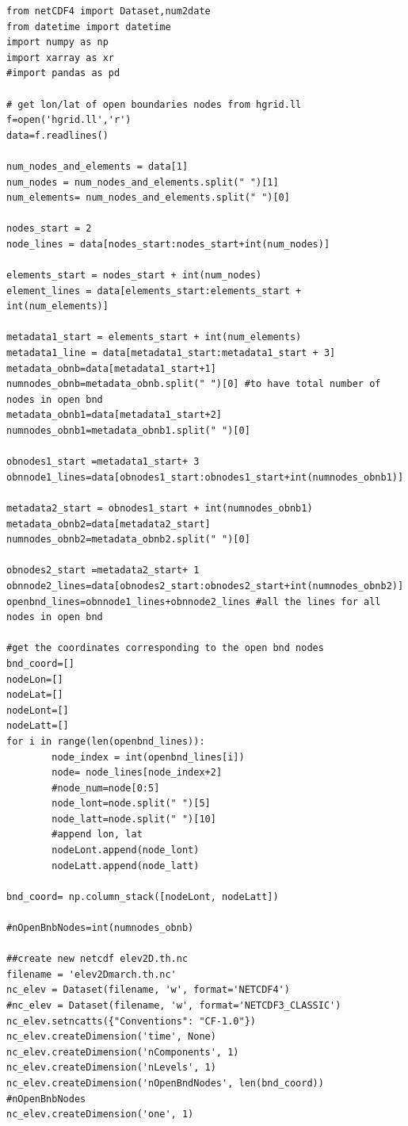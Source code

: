 \documentclass[preprints,briefreport,accept,oneauthor,pdftex]{Definitions/mdpi}
\begin{document}
\begin{verbatim}
from netCDF4 import Dataset,num2date
from datetime import datetime
import numpy as np
import xarray as xr
#import pandas as pd

# get lon/lat of open boundaries nodes from hgrid.ll
f=open('hgrid.ll','r')
data=f.readlines()

num_nodes_and_elements = data[1]
num_nodes = num_nodes_and_elements.split(" ")[1]
num_elements= num_nodes_and_elements.split(" ")[0]

nodes_start = 2
node_lines = data[nodes_start:nodes_start+int(num_nodes)]

elements_start = nodes_start + int(num_nodes) 
element_lines = data[elements_start:elements_start + int(num_elements)]

metadata1_start = elements_start + int(num_elements) 
metadata1_line = data[metadata1_start:metadata1_start + 3]
metadata_obnb=data[metadata1_start+1]
numnodes_obnb=metadata_obnb.split(" ")[0] #to have total number of nodes in open bnd
metadata_obnb1=data[metadata1_start+2]
numnodes_obnb1=metadata_obnb1.split(" ")[0] 

obnodes1_start =metadata1_start+ 3
obnnode1_lines=data[obnodes1_start:obnodes1_start+int(numnodes_obnb1)]

metadata2_start = obnodes1_start + int(numnodes_obnb1)
metadata_obnb2=data[metadata2_start]
numnodes_obnb2=metadata_obnb2.split(" ")[0]

obnodes2_start =metadata2_start+ 1
obnnode2_lines=data[obnodes2_start:obnodes2_start+int(numnodes_obnb2)]
openbnd_lines=obnnode1_lines+obnnode2_lines #all the lines for all nodes in open bnd

#get the coordinates corresponding to the open bnd nodes
bnd_coord=[]
nodeLon=[]
nodeLat=[]
nodeLont=[]
nodeLatt=[]
for i in range(len(openbnd_lines)):
        node_index = int(openbnd_lines[i])
        node= node_lines[node_index+2]
        #node_num=node[0:5]
        node_lont=node.split(" ")[5]
        node_latt=node.split(" ")[10]
        #append lon, lat
        nodeLont.append(node_lont)
        nodeLatt.append(node_latt)

bnd_coord= np.column_stack([nodeLont, nodeLatt])

#nOpenBnbNodes=int(numnodes_obnb)

##create new netcdf elev2D.th.nc
filename = 'elev2Dmarch.th.nc'
nc_elev = Dataset(filename, 'w', format='NETCDF4')
#nc_elev = Dataset(filename, 'w', format='NETCDF3_CLASSIC')
nc_elev.setncatts({"Conventions": "CF-1.0"})
nc_elev.createDimension('time', None)
nc_elev.createDimension('nComponents', 1) 
nc_elev.createDimension('nLevels', 1) 
nc_elev.createDimension('nOpenBndNodes', len(bnd_coord)) #nOpenBnbNodes
nc_elev.createDimension('one', 1) 


\end{verbatim}
\end{document}
